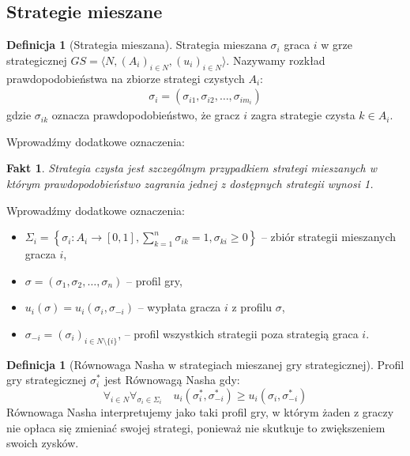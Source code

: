\documentclass[inzynierska]{pwr_wmat_praca_dyplomowa}
\theoremstyle{plain}
\numberwithin{theorem}{chapter}
\newtheorem{fact}[theorem]{Fakt}
\theoremstyle{definition}
\numberwithin{theorem}{chapter}
\newtheorem{definition}[theorem]{Definicja}
\begin{document}
	\subsection{Strategie mieszane}
	\begin{definition}[Strategia mieszana]
		Strategia mieszana $\sigma_i$ graca $i$ w grze strategicznej $GS = \langle N, (A_i)_{i \in N},(u_i)_{i \in N} \rangle $. Nazywamy rozkład prawdopodobieństwa na zbiorze strategi czystych $A_i$:
		\begin{align*}
			\sigma_i = (\sigma_{i1}, \sigma_{i2},\dots,\sigma_{im_i})
		\end{align*}
	gdzie $\sigma_{ik}$ oznacza prawdopodobieństwo, że gracz $i$ zagra strategie czysta $k\in A_i$.  
	\end{definition}
	Wprowadźmy dodatkowe oznaczenia:
	\begin{fact}
		Strategia czysta jest szczególnym przypadkiem strategi mieszanych w którym prawdopodobieństwo zagrania jednej z dostępnych strategii wynosi 1.
	\end{fact}
	Wprowadźmy dodatkowe oznaczenia:
 	\begin{itemize}
 		\item $\Sigma_i  = \left\{ \sigma_i: A_i \rightarrow [0,1],\displaystyle\sum_{k=1}^{n} \sigma_{ik} = 1, \sigma_{ki}\ge 0 \right\}$ -- zbiór strategii mieszanych gracza $i$,
 		\item  $\sigma = (\sigma_1, \sigma_2,\dots,\sigma_n)$ -- profil gry,
 		\item $u_i(\sigma) = u_i(\sigma_i,\sigma_{-i})$ -- wypłata gracza $i$ z profilu $\sigma$,
 		\item $\sigma_{-i} = (\sigma_i)_{i\in N \setminus \{i\}}$, -- profil wszystkich strategii poza strategią graca $i$. 
 	\end{itemize}
	\begin{definition}[Równowaga Nasha w strategiach mieszanej gry strategicznej]
		Profil gry strategicznej $\sigma_i^*$ jest Równowagą Nasha gdy:
		\begin{equation*}
			\displaystyle\mathop{\forall}_{i \in N} 
			\displaystyle\mathop{\forall}_{\sigma_i \in \Sigma_i} \quad
			u_i(\sigma_i^*,\sigma_{-i}^*) \ge u_i(\sigma_i, \sigma_{-i}^*)
		\end{equation*}
	Równowaga Nasha interpretujemy jako taki profil gry, w którym żaden z graczy nie opłaca się zmieniać swojej strategi, ponieważ nie skutkuje to zwiększeniem swoich zysków.
	\end{definition}
\end{document}
